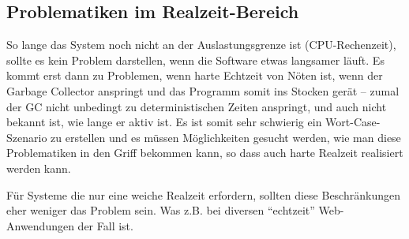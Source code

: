 \subsection{Problematiken im Realzeit-Bereich}


So lange das System noch nicht an der Auslastungsgrenze ist (CPU-Rechenzeit),
sollte es kein Problem darstellen, wenn die Software etwas langsamer läuft.
Es kommt erst dann zu Problemen, wenn harte Echtzeit von Nöten ist, wenn der
Garbage Collector anspringt und das Programm somit ins Stocken gerät -- zumal
der GC nicht unbedingt zu deterministischen Zeiten anspringt, und auch nicht
bekannt ist, wie lange er aktiv ist. Es ist somit sehr schwierig ein
Wort-Case-Szenario zu erstellen und es müssen Möglichkeiten gesucht werden,
wie man diese Problematiken in den Griff bekommen kann, so dass auch harte
Realzeit realisiert werden kann.


Für Systeme die nur eine weiche Realzeit erfordern, sollten diese
Beschränkungen eher weniger das Problem sein. Was z.B. bei diversen 
“echtzeit” Web-Anwendungen der Fall ist.
